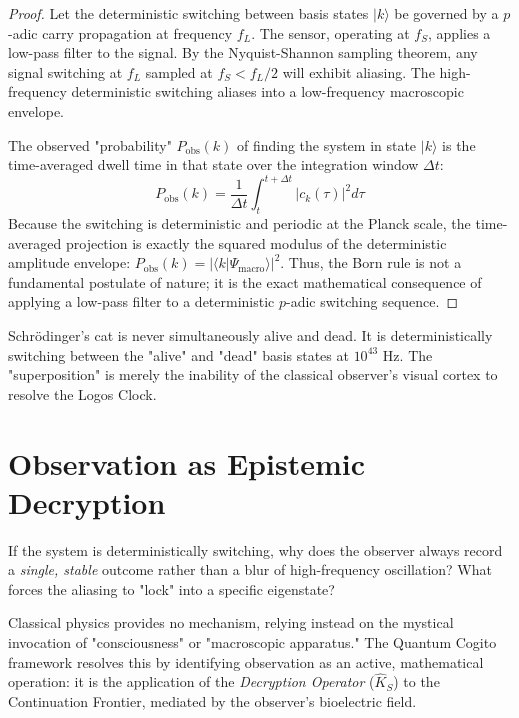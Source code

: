 \documentclass[12pt,twoside]{extbook}
\theoremstyle{definition}
\theoremstyle{remark}
\begin{document}
\begin{proof}
Let the deterministic switching between basis states $|k\rangle$ be governed by a $p$-adic carry propagation at frequency $f_L$. The sensor, operating at $f_S$, applies a low-pass filter to the signal. By the Nyquist-Shannon sampling theorem, any signal switching at $f_L$ sampled at $f_S < f_L/2$ will exhibit aliasing. The high-frequency deterministic switching aliases into a low-frequency macroscopic envelope.

The observed "probability" $P_{\text{obs}}(k)$ of finding the system in state $|k\rangle$ is the time-averaged dwell time in that state over the integration window $\Delta t$:
\begin{equation}
P_{\text{obs}}(k) = \frac{1}{\Delta t} \int_{t}^{t+\Delta t} |c_k(\tau)|^2 d\tau
\end{equation}
Because the switching is deterministic and periodic at the Planck scale, the time-averaged projection is exactly the squared modulus of the deterministic amplitude envelope: $P_{\text{obs}}(k) = |\langle k | \Psi_{\text{macro}} \rangle|^2$. Thus, the Born rule is not a fundamental postulate of nature; it is the exact mathematical consequence of applying a low-pass filter to a deterministic $p$-adic switching sequence.
\end{proof}

Schrödinger’s cat is never simultaneously alive and dead. It is deterministically switching between the "alive" and "dead" basis states at $10^{43}$ Hz. The "superposition" is merely the inability of the classical observer's visual cortex to resolve the Logos Clock.

\section{Observation as Epistemic Decryption}
If the system is deterministically switching, why does the observer always record a \textit{single, stable} outcome rather than a blur of high-frequency oscillation? What forces the aliasing to "lock" into a specific eigenstate?

Classical physics provides no mechanism, relying instead on the mystical invocation of "consciousness" or "macroscopic apparatus." The Quantum Cogito framework resolves this by identifying observation as an active, mathematical operation: it is the application of the \textit{Decryption Operator} ($\hat{K}_S$) to the Continuation Frontier, mediated by the observer's bioelectric field.
\end{document}
